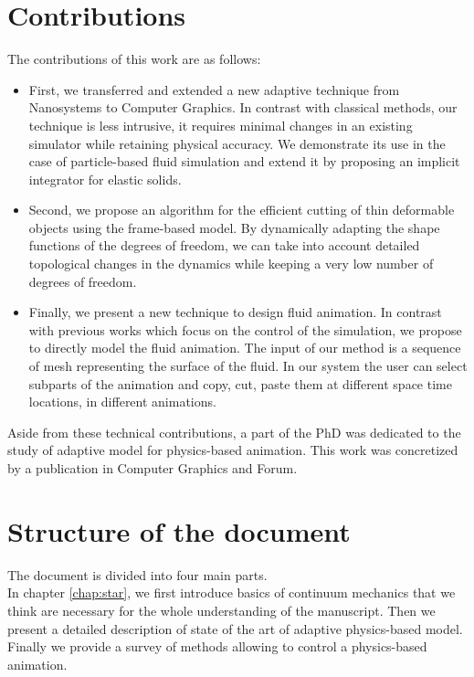 \section{Contributions}
The contributions of this work are as follows:
\begin{itemize}
    \item First, we transferred and extended a new adaptive technique from Nanosystems to Computer Graphics. In contrast with classical methods, our technique is less intrusive, it requires minimal changes in an existing simulator while retaining physical accuracy. We demonstrate its use in the case of particle-based fluid simulation and extend it by proposing an implicit integrator for elastic solids.
    \item Second, we propose an algorithm for the efficient cutting of thin deformable objects using the frame-based model. By dynamically adapting the shape functions of the degrees of freedom, we can take into account detailed topological changes in the dynamics while keeping a very low number of degrees of freedom.
    \item Finally, we present a new technique to design fluid animation. In contrast with previous works which focus on the control of the simulation, we propose to directly model the fluid animation. The input of our method is a sequence of mesh representing the surface of the fluid. In our system the user can select subparts of the animation and copy, cut, paste them at different space time locations, in different animations.
\end{itemize}

Aside from these technical contributions, a part of the PhD was dedicated to the study of adaptive model for physics-based animation. This work was concretized by a publication in Computer Graphics and Forum.

\section{Structure of the document}
The document is divided into four main parts. \\

In chapter \ref{chap:star}, we first introduce basics of continuum mechanics that we think are necessary for the whole understanding of the manuscript. Then we present a detailed description of state of the art of adaptive physics-based model. Finally we provide a survey of methods allowing to control a physics-based animation. \\


